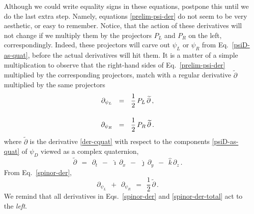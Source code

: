 \documentclass[epsfig,12pt]{article}
\newcommand{\p}{\partial}
\newcommand{\wt}{\widetilde}
\newcommand{\ii}{\hat\imath}
\newcommand{\jj}{\hat\jmath}
\newcommand{\kk}{\hat k}
\begin{document}
	Although we could write equality signs in these equations, postpone this
	until we do the last extra step.
	Namely, equations \eqref{prelim-psi-der} do not seem to be very aesthetic,
	or easy to remember.
	Notice, that the action of these derivatives will not change if we multiply
	them by the projectors $ P_L $ and $ P_R $ on the left, correspondingly.
	Indeed, these projectors will carve out $ \psi_L $ or $ \psi_R $ from Eq.~\eqref{psiD-as-quat},
	before the actual derivatives will hit them.
	It is a matter of a simple multiplication to observe that the right-hand
	sides of Eq.~\eqref{prelim-psi-der} multiplied by the corresponding projectors,
	match with a regular derivative $ \wt\p $ multiplied by the same projectors
\begin{align}
%
\notag
	\p_{\psi_L}	& ~~=~~		\frac 1 2\, P_L\, \wt\p\,,
	\\[4mm]
%
\label{spinor-der}
	\p_{\psi_R}	& ~~=~~		\frac 1 2\, P_R\, \wt\p\,.
\end{align}
	where $ \wt\p $ is the derivative \eqref{der-cquat} with respect
	to the components \eqref{psiD-as-quat} of $ \psi_D $ viewed as a complex quaternion,
\begin{equation}
	\wt\p	~~=~~	\p_t  ~~-~~  \ii\,\p_x  ~~-~~  \jj\,\p_y  ~~-~~  \kk\,\p_z\,.
\end{equation}
	From Eq.~\eqref{spinor-der}, 
\begin{equation}
\label{spinor-der-total}
	\p_{\psi_L}  ~~+~~  \p_{\psi_R}  ~~=~~  \frac 1 2\, \wt\p\,.
\end{equation}
	We remind that all derivatives in Eqs.~\eqref{spinor-der} and \eqref{spinor-der-total}
	act to the \emph{left}.
\end{document}
